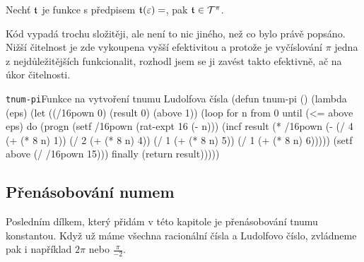 \begin{consequence}
Nechť $\mathfrak{t}^{}$ je funkce s předpisem $\mathfrak{t}^{}(\varepsilon)=$, pak $\mathfrak{t}^{}\in\mathcal{T}^{\pi}$.
\end{consequence}

Kód vypadá trochu složitěji, ale není to nic jiného, než co bylo právě popsáno. Nižší čitelnost je zde vykoupena vyšší efektivitou a protože je vyčíslování $\pi$ jedna z nejdůležitějších funkcionalit, rozhodl jsem se ji zavést takto efektivně, ač na úkor čitelnosti.

\begin{lispcode}{\texttt{tnum-pi}}{Funkce na vytvoření tnumu Ludolfova čísla}
(\textcolor{funkcionalni}{defun} \textcolor{pojmenovan}{tnum-pi} ()
  (\textcolor{funkcionalni}{lambda} (eps)
    (\textcolor{vedlejsi}{let} ((/16pown 0) (result 0) (above 1))
      (\textcolor{funkcionalni}{loop} \textcolor{obarvi}{for} n \textcolor{obarvi}{from} 0
        \textcolor{obarvi}{until} (\textcolor{matematicke}{<=} above eps)
        \textcolor{obarvi}{do} (\textcolor{funkcionalni}{progn} 
          (\textcolor{vedlejsi}{setf} /16pown (\textcolor{moje}{rat-expt} 16 (\textcolor{matematicke}{-} n)))
          (\textcolor{vedlejsi}{incf} result
            (\textcolor{matematicke}{*} /16pown
              (\textcolor{matematicke}{-} (\textcolor{matematicke}{/} 4 (\textcolor{matematicke}{+} (\textcolor{matematicke}{*} 8 n) 1))
                (\textcolor{matematicke}{/} 2 (\textcolor{matematicke}{+} (\textcolor{matematicke}{*} 8 n) 4))
                (\textcolor{matematicke}{/} 1 (\textcolor{matematicke}{+} (\textcolor{matematicke}{*} 8 n) 5))
                (\textcolor{matematicke}{/} 1 (\textcolor{matematicke}{+} (\textcolor{matematicke}{*} 8 n) 6)))))
          (\textcolor{vedlejsi}{setf} above (\textcolor{matematicke}{/} /16pown 15)))
        \textcolor{obarvi}{finally} (\textcolor{funkcionalni}{return} result)))))
\end{lispcode}

\subsection{Přenásobování numem}
Posledním dílkem, který přidám v této kapitole je přenásobování tnumu konstantou. Když už máme všechna racionální čísla a Ludolfovo číslo, zvládneme pak i například $2\pi$ nebo $\frac{\pi}{-2}$.


